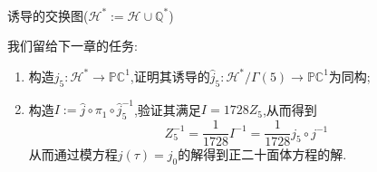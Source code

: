 \begin{center}
\end{center}
\vspace{-2cm}\\[1.5cm]
诱导的交换图($\mathcal{H}^*:=\mathcal{H} \cup \mathbb{Q}^*$)

\begin{center}
\end{center}
我们留给下一章的任务:
\begin{enumerate}
	\item 构造$j_5:\mathcal{H}^* \longrightarrow \mathbb{PC}^1 $,证明其诱导的$\hat{j}_5:\mathcal{H}^*/\Gamma(5) \longrightarrow \mathbb{PC}^1$为同构;
	\item 构造$I:= \hat{j} \circ \pi_1 \circ \hat{j}_5^{-1}$,验证其满足$I=1728Z_5$,从而得到
	$$Z_5^{-1}=\frac{1}{1728}I^{-1}=\frac{1}{1728}j_5 \circ j^{-1}$$
	从而通过模方程$j(\tau)=j_0$的解得到正二十面体方程的解.
\end{enumerate}